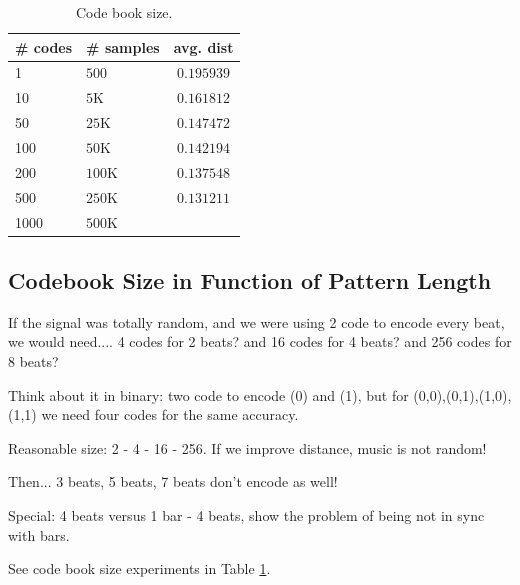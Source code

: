 \documentclass{article}
\begin{document}
\begin{table}
\begin{center}
\begin{tabular}{|l|l|c|}
\hline
\# codes & \# samples & avg. dist \\ \hline \hline
1 & $500$ & $0.195939$ \\
10 & $5$K & $0.161812$ \\
50 & $25$K & $0.147472$ \\
100 & $50$K & $0.142194$ \\
200 & $100$K & $0.137548$ \\
500 & $250$K & $0.131211$ \\
1000 & $500$K & \\ \hline
\end{tabular}
\end{center}
\caption{{Code book size.}}
\label{tab:cbsize}
\end{table}


\subsection{Codebook Size in Function of Pattern Length}
If the signal was totally random, and we were using 2 code to encode
every beat, we would need.... 4 codes for 2 beats? and 16 codes for
4 beats? and 256 codes for 8 beats?

Think about it in binary: two code to encode (0) and (1), but for
(0,0),(0,1),(1,0),(1,1) we need four codes for the same accuracy.

Reasonable size: 2 - 4 - 16 - 256. If we improve distance, music
is not random!

Then... 3 beats, 5 beats, 7 beats don't encode as well!

Special: 4 beats versus 1 bar - 4 beats, show the problem of being
not in sync with bars.

See code book size experiments in Table \ref{tab:cbsize}.
\end{document}
